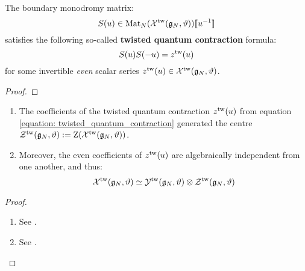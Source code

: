         \begin{definition} \label{def: (extended)_twisted_yangians}
            
        \end{definition}

        \begin{lemma} \label{lemma: twisted_quantum_contractions}
            The boundary monodromy matrix:
                $$S(u) \in \operatorname{Mat}_N( \mathcal{X}^{\mathrm{tw}}(\mathfrak{g}_N, \vartheta) )[\![u^{-1}]\!]$$
            satisfies the following so-called \textbf{twisted quantum contraction} formula:
                \begin{equation} \label{equation: twisted_quantum_contraction}
                    S(u) S(-u) = z^{\mathrm{tw}}(u)
                \end{equation}
            for some invertible \textit{even} scalar series $z^{\mathrm{tw}}(u) \in \mathcal{X}^{\mathrm{tw}}(\mathfrak{g}_N, \vartheta)$.
        \end{lemma}
            \begin{proof}
                
            \end{proof}
        \begin{lemma} \label{lemma: centres_of_extended_twisted_yangians}
            \begin{enumerate}
                \item The coefficients of the twisted quantum contraction $z^{\mathrm{tw}}(u)$ from equation \eqref{equation: twisted_quantum_contraction} generated the centre $\mathcal{Z}^{\mathrm{tw}}(\mathfrak{g}_N, \vartheta) := \mathrm{Z}( \mathcal{X}^{\mathrm{tw}}(\mathfrak{g}_N, \vartheta) )$.
                \item Moreover, the even coefficients of $z^{\mathrm{tw}}(u)$ are algebraically independent from one another, and thus:
                    $$\calX^{\tw}(\g_N, \vartheta) \cong \calY^{\tw}(\g_N, \vartheta) \tensor \calZ^{\tw}(\g_N, \vartheta)$$
            \end{enumerate}
        \end{lemma}
            \begin{proof}
                \begin{enumerate}
                    \item See \cite[Corollary 3.5]{guay_regelskis_twisted_yangians_for_symmetric_pairs_of_types_BCD}.
                    \item See \cite[Corollary 3.6]{guay_regelskis_twisted_yangians_for_symmetric_pairs_of_types_BCD}.
                \end{enumerate}
            \end{proof}